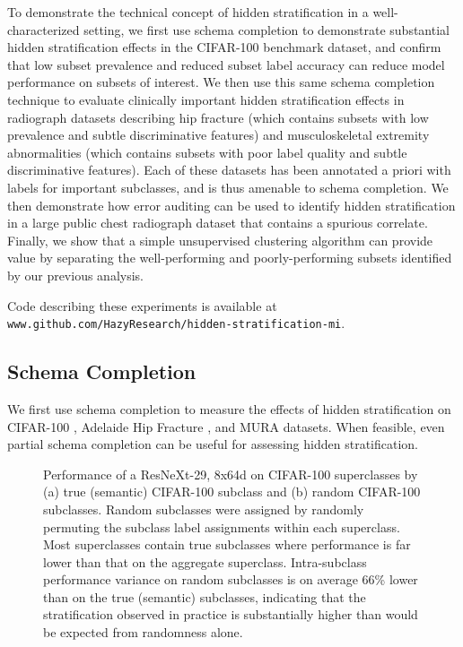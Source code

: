 \documentclass[sigconf]{acmart}
\begin{document}
To demonstrate the technical concept of hidden stratification in a well-characterized setting, we first use schema completion to demonstrate substantial hidden stratification effects in the CIFAR-100 benchmark dataset, and confirm that low subset prevalence and reduced subset label accuracy can reduce model performance on subsets of interest.
We then use this same schema completion technique to evaluate clinically important hidden stratification effects in radiograph datasets describing hip fracture (which contains subsets with low prevalence and subtle discriminative features) and musculoskeletal extremity abnormalities (which contains subsets with poor label quality and subtle discriminative features).
Each of these datasets has been annotated a priori with labels for important subclasses, and is thus amenable to schema completion.
We then demonstrate how error auditing can be used to identify hidden stratification in a large public chest radiograph dataset that contains a spurious correlate.
Finally, we show that a simple unsupervised clustering algorithm can provide value by separating the well-performing and poorly-performing subsets identified by our previous analysis.

Code describing these experiments is available at  \\ \texttt{www.github.com/HazyResearch/hidden-stratification-mi}.

\subsection{Schema Completion}

We first use schema completion to measure the effects of hidden stratification on CIFAR-100 \citep{Krizhevsky2009-tq}, Adelaide Hip Fracture \citep{Gale_W_Oakden-Rayner_L_Carneiro_G_Bradley_AP_Palmer_LJ2017-tl},  and MURA \citep{Rajpurkar2017-rc} datasets.
When feasible, even partial schema completion can be useful for assessing hidden stratification.

 \begin{figure*}[htb!]
 \centering
{}%
\caption{Performance of a ResNeXt-29, 8x64d on CIFAR-100 superclasses by (a) true (semantic) CIFAR-100 subclass and (b) random CIFAR-100 subclasses.  Random subclasses were assigned by randomly permuting the subclass label assignments within each superclass.  Most superclasses contain true subclasses where performance is far lower than that on the aggregate superclass.  Intra-subclass performance variance on random subclasses is on average 66\% lower than on the true (semantic) subclasses, indicating that the stratification observed in practice is substantially higher than would be expected from randomness alone.}
\label{fig:cifar}
\end{figure*}
\end{document}
